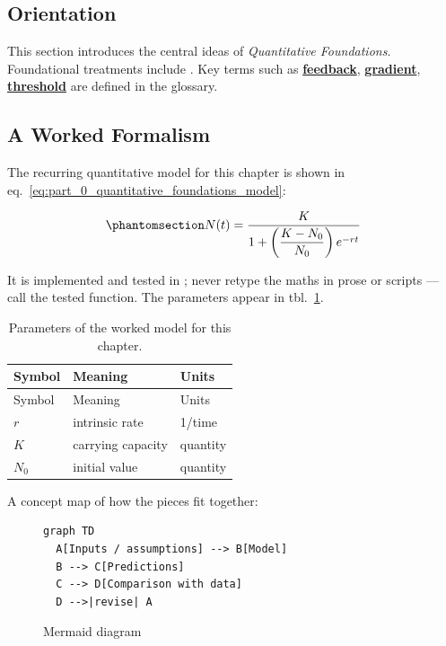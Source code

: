 \documentclass[
]{article}
\theoremstyle{plain}
\theoremstyle{definition}
\begin{document}
\subsection{Orientation}\label{orientation-2}

This section introduces the central ideas of \emph{Quantitative
Foundations}. Foundational treatments include
\citep{smith2020foundations, doe2019methods}. Key terms such as
\hyperref[gl:feedback]{\textbf{feedback}},
\hyperref[gl:gradient]{\textbf{gradient}},
\hyperref[gl:threshold]{\textbf{threshold}} are defined in the glossary.

\subsection{A Worked Formalism}\label{a-worked-formalism-2}

The recurring quantitative model for this chapter is shown in
eq.~\ref{eq:part_0_quantitative_foundations_model}:

\begin{equation}\protect\phantomsection\label{eq:part_0_quantitative_foundations_model}{ N(t) = \frac{K}{1 + \left(\dfrac{K - N_0}{N_0}\right) e^{-rt}} }\end{equation}

It is implemented and tested in
; never retype the maths in
prose or scripts --- call the tested function. The parameters appear in
tbl.~\ref{tbl:part_0_quantitative_foundations_parameters}.

\begin{longtable}[]{@{}lll@{}}
\caption{Parameters of the worked model for this
chapter.}\label{tbl:part_0_quantitative_foundations_parameters}\tabularnewline
\toprule\noalign{}
Symbol & Meaning & Units \\
\midrule\noalign{}
\endfirsthead
\toprule\noalign{}
Symbol & Meaning & Units \\
\midrule\noalign{}
\endhead
\bottomrule\noalign{}
\endlastfoot
\(r\) & intrinsic rate & 1/time \\
\(K\) & carrying capacity & quantity \\
\(N_0\) & initial value & quantity \\
\end{longtable}

A concept map of how the pieces fit together:

\begin{figure}[htbp]
\centering
\begin{verbatim}
graph TD
  A[Inputs / assumptions] --> B[Model]
  B --> C[Predictions]
  C --> D[Comparison with data]
  D -->|revise| A
\end{verbatim}
\caption{Mermaid diagram}
\end{figure}
\end{document}
